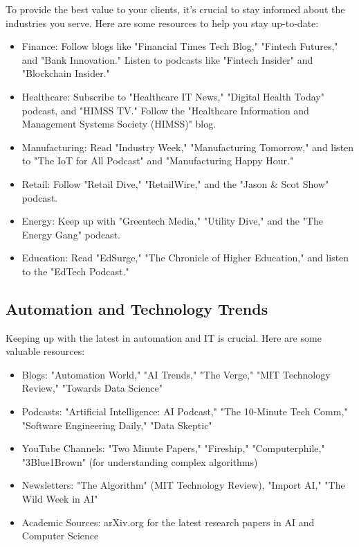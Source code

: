 To provide the best value to your clients, it's crucial to stay informed about the industries you serve. Here are some resources to help you stay up-to-date:

\begin{itemize}
    \item Finance: Follow blogs like "Financial Times Tech Blog," "Fintech Futures," and "Bank Innovation." Listen to podcasts like "Fintech Insider" and "Blockchain Insider."
    \item Healthcare: Subscribe to "Healthcare IT News," "Digital Health Today" podcast, and "HIMSS TV." Follow the "Healthcare Information and Management Systems Society (HIMSS)" blog.
    \item Manufacturing: Read "Industry Week," "Manufacturing Tomorrow," and listen to "The IoT for All Podcast" and "Manufacturing Happy Hour."
    \item Retail: Follow "Retail Dive," "RetailWire," and the "Jason \& Scot Show" podcast.
    \item Energy: Keep up with "Greentech Media," "Utility Dive," and the "The Energy Gang" podcast.
    \item Education: Read "EdSurge," "The Chronicle of Higher Education," and listen to the "EdTech Podcast."
\end{itemize}

\subsection{Automation and Technology Trends}

Keeping up with the latest in automation and IT is crucial. Here are some valuable resources:

\begin{itemize}
    \item Blogs: "Automation World," "AI Trends," "The Verge," "MIT Technology Review," "Towards Data Science"
    \item Podcasts: "Artificial Intelligence: AI Podcast," "The 10-Minute Tech Comm," "Software Engineering Daily," "Data Skeptic"
    \item YouTube Channels: "Two Minute Papers," "Fireship," "Computerphile," "3Blue1Brown" (for understanding complex algorithms)
    \item Newsletters: "The Algorithm" (MIT Technology Review), "Import AI," "The Wild Week in AI"
    \item Academic Sources: arXiv.org for the latest research papers in AI and Computer Science
\end{itemize}

